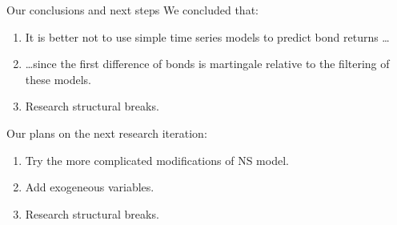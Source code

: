 \documentclass[aspectratio=169]{beamer}
\begin{document}
    \begin{frame}{Our conclusions and next steps}
    We concluded that:
    \begin{enumerate}
        \item It is better not to use simple time series 
        models to predict bond returns \ldots
        \item \ldots since the first difference of bonds is martingale relative to the filtering of these models.
        \item Research structural breaks.
    \end{enumerate}
    Our plans on the next research iteration:
    \begin{enumerate}
        \item Try the more complicated modifications of NS model.
        \item Add exogeneous variables.
        \item Research structural breaks.
    \end{enumerate}
    \end{frame}
\end{document}
